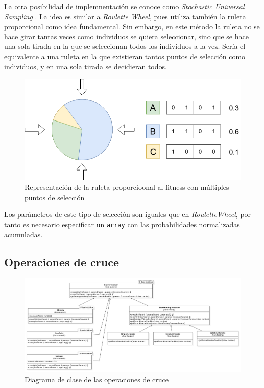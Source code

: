 La otra posibilidad de implemnentación se conoce como \textit{Stochastic Universal Sampling} \cite{baker1987reducing}. La idea es similar a \textit{Roulette Wheel}, pues utiliza también la ruleta proporcional como idea fundamental. Sin embargo, en este método la ruleta no se hace girar tantas veces como individuos se quiera seleccionar, sino que se hace una sola tirada en la que se seleccionan todos los individuos a la vez. Sería el equivalente a una ruleta en la que existieran tantos puntos de selección como individuos, y en una sola tirada se decidieran todos. \\

\begin{figure}[H]
    \centering
    \includegraphics[scale=0.5]{mem/images/cap-4/4.2.5(Selection)/SUS-1.png}
    \caption{Representación de la ruleta proporcioonal al fitness con múltiples puntos de selección}
    \label{fig:roulette-wheel-example}
\end{figure}

Los parámetros de este tipo de selección son iguales que en \textit{RouletteWheel}, por tanto es necesario especificar un \texttt{array} con las probabilidades normalizadas acumuladas.

\subsection{Operaciones de cruce}

\begin{figure}[ht]
    \centering
    \includegraphics[scale=0.3]{mem/images/cap-4/4.2.6(Crossover)/Crossover.png}
    \caption{Diagrama de clase de las operaciones de cruce}
    \label{fig:my_label}
\end{figure}

